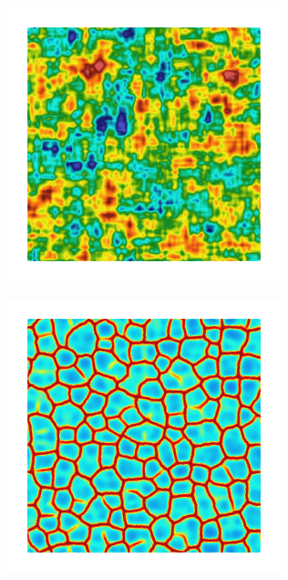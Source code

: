 \begin{figure}[!htb]
\begin{subfigure}[b]{0.15\textwidth}
    \caption{}
    \label{fig: Chapter4/2D/Gc_exp_cartesian_5_5_rho_0_seed_c}
  \end{subfigure}
  \begin{subfigure}[b]{0.15\textwidth}
    \includegraphics[width=\textwidth]{Chapter4/figures/2D/psic_exp_cartesian_5_5_rho_0_seed_c.png}
    \caption{}
    \label{fig: Chapter4/2D/psic_exp_cartesian_5_5_rho_0_seed_c}
  \end{subfigure}
  \begin{subfigure}[b]{0.15\textwidth}
    \includegraphics[width=\textwidth]{Chapter4/figures/2D/d_exp_cartesian_5_5_rho_0_seed_c.png}
    \caption{}
    \label{fig: Chapter4/2D/d_exp_cartesian_5_5_rho_0_seed_c}
  \end{subfigure}
  

\end{figure}
